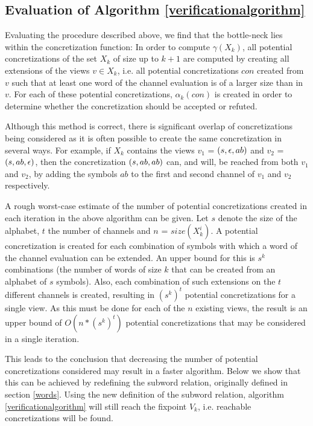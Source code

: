 \subsection{Evaluation of Algorithm \ref{verificationalgorithm}}
Evaluating the procedure described above, we find that the bottle-neck lies within the concretization function:
 In order to compute $\gamma(X_k)$, all potential concretizations of the set $X_k$ of size up to $k+1$ are computed by creating all extensions of the views $v \in X_k$, i.e. all potential concretizations $con$ created from $v$ such that at least one word of the channel evaluation is of a larger size than in $v$. For each of these potential concretizations, $\alpha_k(con)$ is created in order to determine whether the concretization should be accepted or refuted.

Although this method is correct, there is significant overlap of concretizations being considered as it is often possible to create the same concretization  in several ways. For example, if $X_k$ contains the views $v_1$ = $(s, \epsilon, ab)$ and $v_2$ = $(s, ab, \epsilon)$, then the concretization $(s, ab,ab)$ can, and will, be reached from both $v_1$ and $v_2$, by adding the symbols $ab$ to the first and second channel of $v_1$ and $v_2$ respectively.

A rough worst-case estimate of the number of potential concretizations created in each iteration in the above algorithm can be given. Let $s$ denote the size of the alphabet, $t$ the number of channels and $n$ = $size(X_k^i)$. A potential concretization is created for each combination of symbols with which a word of the channel evaluation can be extended. An upper bound for this is $s^k$ combinations (the number of words of size $k$ that can be created from an alphabet of $s$ symbols). Also, each combination of such extensions on the $t$ different channels is created, resulting in $(s^k)^t$ potential concretizations for a single view. As this must be done for each of the $n$ existing views, the result is an upper bound of $O(n*(s^k)^t)$ potential concretizations that may be considered in a single iteration.

This leads to the conclusion that decreasing the number of potential concretizations considered may result in a faster algorithm. Below we show that this can be achieved by redefining the subword relation, originally defined in section \ref{words}. Using the new definition of the subword relation, algorithm \ref{verificationalgorithm} will still reach the fixpoint $V_k$, i.e. reachable concretizations will be found.

